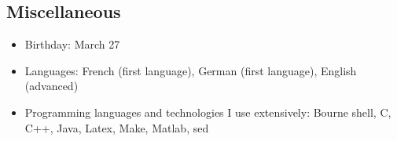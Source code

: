 \documentclass[line,margin]{res}
\begin{document}
\begin{resume}
\section{Miscellaneous}
\begin{itemize}
  \item Birthday:  March 27
  \item Languages: French (first language), German (first language),
    English (advanced)
  \item Programming languages and technologies I use extensively:
    Bourne shell, C, C++, Java, Latex, Make, Matlab, sed
\end{itemize}

\end{resume}
\end{document}
